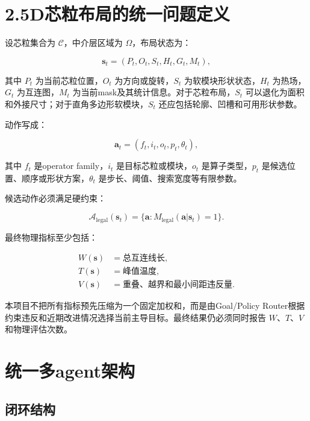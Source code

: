 \documentclass[UTF8,a4paper,12pt]{ctexart}
\newcommand{\state}{\boldsymbol{s}}
\newcommand{\action}{\boldsymbol{a}}
\newcommand{\legalitymask}{M_{\mathrm{legal}}}
\begin{document}
\section{2.5D芯粒布局的统一问题定义}

设芯粒集合为 $\mathcal C$，中介层区域为 $\Omega$，布局状态为：

\begin{equation}
\state_t=(P_t,O_t,S_t,H_t,G_t,M_t),
\end{equation}

其中 $P_t$ 为当前芯粒位置，$O_t$ 为方向或旋转，$S_t$ 为软模块形状状态，$H_t$ 为热场，$G_t$ 为互连图，$M_t$ 为当前mask及其统计信息。对于芯粒布局，$S_t$ 可以退化为面积和外接尺寸；对于直角多边形软模块，$S_t$ 还应包括轮廓、凹槽和可用形状参数。

动作写成：

\begin{equation}
\action_t=(f_t,i_t,o_t,p_t,\theta_t),
\end{equation}

其中 $f_t$ 是operator family，$i_t$ 是目标芯粒或模块，$o_t$ 是算子类型，$p_t$ 是候选位置、顺序或形状方案，$\theta_t$ 是步长、阈值、搜索宽度等有限参数。

候选动作必须满足硬约束：

\begin{equation}
\mathcal A_{\mathrm{legal}}(\state_t)=
\{\action: \legalitymask(\action|\state_t)=1\}.
\end{equation}

最终物理指标至少包括：

\begin{align}
 W(\state)&=\text{总互连线长},\\
 T(\state)&=\text{峰值温度},\\
 V(\state)&=\text{重叠、越界和最小间距违反量}.
\end{align}

本项目不把所有指标预先压缩为一个固定加权和，而是由Goal/Policy Router根据约束违反和近期改进情况选择当前主导目标。最终结果仍必须同时报告 $W$、$T$、$V$ 和物理评估次数。

\section{统一多agent架构}

\subsection{闭环结构}
\end{document}

